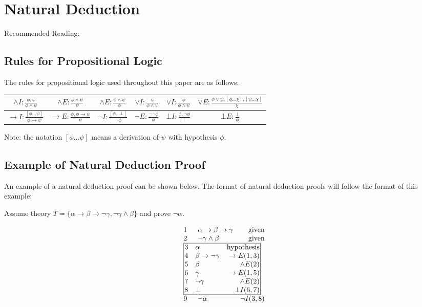 \documentclass[11pt,twoside,a4paper]{report}
\begin{document}
\section{Natural Deduction}
Recommended Reading: \citep*[pp. 17-225]{languageproofandlogic}

\subsection{Rules for Propositional Logic}
\label{subsec:logicrules}
The rules for propositional logic used throughout this paper are as follows:

\begin{tabular}{|c|c|c|c|c|c|}
\hline
$\wedge I:\frac{\phi, \psi}{\phi\wedge\psi}$ &
$\wedge E:\frac{\phi\wedge\psi}{\psi}$ &
$\wedge E:\frac{\phi\wedge\psi}{\phi}$ &
$\vee I:\frac{\psi}{\phi\wedge\psi}$ & 
$\vee I:\frac{\phi}{\phi\wedge\psi}$ &
$\vee E:\frac{\phi\vee\psi, [\phi...\chi], [\psi...\chi]}{\chi}$ \\
\hline
$\rightarrow I:\frac{[\phi...\psi]}{\phi\rightarrow\psi}$ & 
$\rightarrow E:\frac{\phi, \phi\rightarrow\psi}{\psi}$ &
$\neg I:\frac{[\phi...\bot]}{\neg\phi}$ &
$\neg E:\frac{\neg\neg\phi}{\phi}$ &
$\bot I:\frac{\phi, \neg\phi}{\bot}$ &
$\bot E:\frac{\bot}{\phi}$ \\
\hline
\end{tabular}

Note: the notation $[\phi...\psi]$ means a derivation of $\psi$ with hypothesis $\phi$.

\subsection{Example of Natural Deduction Proof}
An example of a natural deduction proof can be shown below. The format of natural deduction proofs will follow the format of this example:

Assume theory $T = \{\alpha\rightarrow\beta\rightarrow\neg\gamma, \neg\gamma\wedge\beta\}$ and prove $\neg\alpha$.

\[\vbox{\offinterlineskip\halign{
&\tabskip=1.5em#\strut&$#$\hfil\tabskip=1em&\hfil$#$\tabskip=0em\cr
%
1&\alpha\rightarrow\beta\rightarrow\gamma&\mbox{given}\cr
2&\neg\gamma\wedge\beta&\mbox{given}\cr
%
\multispan3\vbox{\halign{
\vrule#&&\hskip.1em\tabskip=1em#\strut&$#$\hfil\tabskip=1em&\hfil$#$\hskip0.1em\tabskip=0em&\vrule#\cr
\noalign{\hrule}
%
&3&\alpha&\mbox{hypothesis}&\cr
&4&\beta\rightarrow\neg\gamma&\rightarrow E(1,3)&\cr
&5&\beta&\wedge E(2)&\cr
&6&\gamma&\rightarrow E(1,5)&\cr
&7&\neg\gamma&\wedge E(2)&\cr
&8&\bot&\bot I(6,7)&\cr
%
\noalign{\hrule}}}\,\cr
%
9&\neg\alpha&\neg I(3,8)\cr
}}\]
\end{document}
